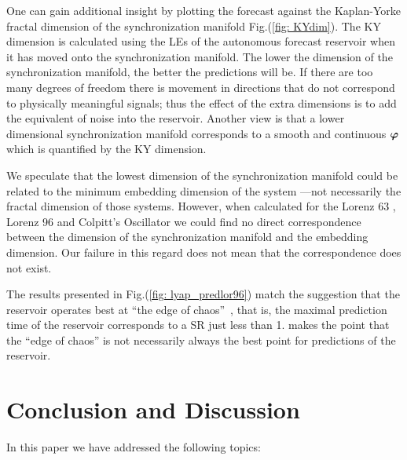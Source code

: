 \documentclass[12pt]{article}
\begin{document}
One can gain additional insight by plotting the forecast against the Kaplan-Yorke fractal dimension of the synchronization manifold Fig.(\ref{fig: KYdim}).  The KY dimension is calculated using the LEs of the autonomous forecast reservoir when it has moved onto the synchronization manifold. The lower the dimension of the synchronization manifold, the better the predictions will be. If there are too many degrees of freedom there is movement in directions that do not correspond to physically meaningful signals; thus the effect of the extra dimensions is to add the equivalent of noise into the reservoir. Another view is that a lower dimensional synchronization manifold corresponds to a smooth and continuous $\mbox{$\boldsymbol{\varphi}$}$ which is quantified by the KY dimension.

We speculate that the lowest dimension of the synchronization manifold could be related to the minimum embedding dimension of the system \cite{abar96}---not necessarily the fractal dimension of those systems.  However, when calculated for the Lorenz 63 \cite{lor63}, Lorenz 96 \cite{lor96} and Colpitt's Oscillator we could find no direct correspondence between the dimension of the synchronization manifold and the embedding dimension.  Our failure in this regard does not mean that the correspondence does not exist.

The results presented in Fig.(\ref{fig: lyap_predlor96}) match the suggestion that the reservoir operates best at ``the edge of chaos''~\cite{verstraten09, Boedecker12, Jiang19}, that is, the maximal prediction time of the reservoir corresponds to a SR just less than 1.  \cite{Carroll20} makes the point that the ``edge of chaos'' is not necessarily always the best point for predictions of the reservoir.

\section{Conclusion and Discussion}\label{conclusions}

In this paper we have addressed the following topics:
\end{document}
